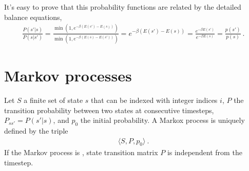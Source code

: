 \documentclass[letterpaper,10pt,english]{jupyterBook}
\begin{document}
\sphinxAtStartPar
It’s easy to prove that this probability functions are related by the detailed balance equations,
\begin{equation*}
\begin{split}\frac{P(s'|s)}{P(s|s')} = \frac{\min \left( 1, e^{ -\beta ( E(s') - E(s) )  } \right) }{\min \left( 1, e^{ -\beta ( E(s) - E(s') )  } \right) } = e^{ -\beta ( E(s') - E(s) )  } = \frac{e^{-\beta E(s')}}{e^{-\beta E(s)}} = \frac{p(s')}{p(s)} \ .\end{split}
\end{equation*}
\sphinxstepscope


\section{Markov processes}
\label{\detokenize{ch/statistical-mechanics/markov-process-notes:markov-processes}}\label{\detokenize{ch/statistical-mechanics/markov-process-notes:statistical-mechanics-markov-process}}\label{\detokenize{ch/statistical-mechanics/markov-process-notes::doc}}
\sphinxAtStartPar
{} Let \(S\) a finite set of state \(s\) that can be indexed with integer indices \(i\), \(P\) the transition probability between two states at consecutive time\sphinxhyphen{}steps, \(P_{ss'} = P(s'|s)\), and \(p_0\) the initial probability. A Markox process is uniquely defined by the triple
\begin{equation*}
\begin{split}\langle S, P, p_0 \rangle \ .\end{split}
\end{equation*}
\sphinxAtStartPar
If the Markov process is , state transition matrix \(P\) is independent from the time\sphinxhyphen{}step.
\end{document}
